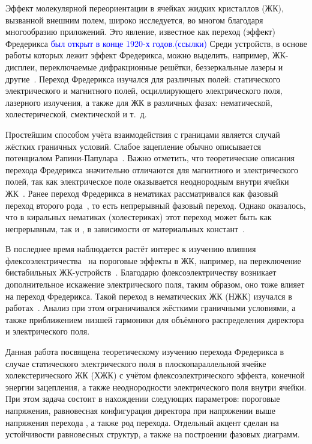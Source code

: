 Эффект молекулярной переориентации в ячейках жидких кристаллов (ЖК), вызванной внешним полем, широко исследуется, во многом благодаря многообразию приложений.
Это явление, известное как переход (эффект) Фредерикса \textcolor{blue}{был открыт в конце 1920-х годов.(ссылки)}
Среди устройств, в основе работы которых лежит эффект Фредерикса, можно выделить, например, ЖК-дисплеи, переключаемые дифракционные решётки, беззеркальные лазеры и другие~\autocite{YangWu2014}. 
Переход Фредерикса изучался для различных полей: статического электрического и магнитного полей, осциллирующего электрического поля, лазерного излучения, а также для ЖК в различных фазах: нематической, холестерической, смектической и т.~д.~\autocite{Blinov1994,deGennesbook1995,stewartBook}

Простейшим способом учёта взаимодействия с границами является случай жёстких граничных условий.
Слабое зацепление обычно описывается потенциалом Рапини-Папулара~\autocite{Rapini69}.
Важно отметить, что теоретические описания перехода Фредерикса значительно отличаются для магнитного и электрического полей, так как электрическое поле оказывается неоднородным внутри ячейки ЖК~\autocite{Deuling,NonHomoElectricField1972,CTBerr,Arakelyan1984,Napoli2006}.
Ранее переход Фредерикса в нематиках рассматривался как фазовый переход второго рода~\autocite{Guyon1975}, то есть непрерывный фазовый переход.
Однако оказалось, что в киральных нематиках (холестериках) этот переход может быть как непрерывным, так и , в зависимости от материальных констант~\autocite{VAR2013}.

В последнее время наблюдается растёт интерес к изучению влияния флексоэлектричества~\autocite{buka2012flexoelectricity} на пороговые эффекты в ЖК, например, на переключение бистабильных ЖК-устройств~\autocite{Davidson2002,  Parry-Jones2009, Cummings2013}.
Благодарю флексоэлектричеству возникает дополнительное искажение электрического поля, таким образом, оно тоже влияет на переход Фредерикса.
Такой переход в нематических ЖК (НЖК) изучался в работах~\autocite{Brown2003,Brown2007,Mema2017}.
Анализ при этом ограничивался жёсткими граничными условиями, а также приближением низшей гармоники для объёмного распределения директора и электрического поля.

Данная работа посвящена теоретическому изучению перехода Фредерикса в случае статического электрического поля в плоскопараллельной ячейке холекстерического ЖК (ХЖК) с учётом флексоэлектрического эффекта, конечной энергии зацепления, а также неоднородности электрического поля внутри ячейки.
При этом задача состоит в нахождении следующих параметров: пороговые напряжения, равновесная конфигурация директора при напряжении выше напряжения перехода , а также род перехода.
Отдельный акцент сделан на устойчивости равновесных структур, а также на построении фазовых диаграмм.

